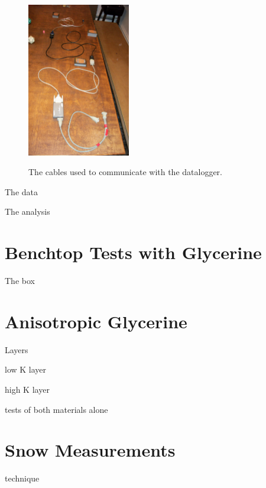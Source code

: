 \begin{figure}[h]
\centering
\includegraphics[width=0.4\textwidth]{fig/cable.jpg}
\label{fig:cable}
\caption{The cables used to communicate with the datalogger.}
\end{figure}

The data

The analysis

\section{Benchtop Tests with Glycerine}

The box

\section{Anisotropic Glycerine}

Layers

low K layer

high K layer

tests of both materials alone

\section{Snow Measurements}

technique
